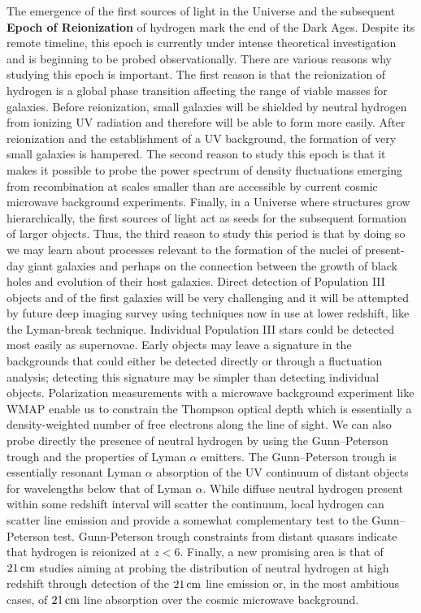 \documentclass[a4paper,11pt]{article}
\begin{document}
The emergence of the first sources of light in the Universe and the subsequent \textbf{Epoch of Reionization} of hydrogen mark the end of the Dark Ages. Despite its remote timeline, this epoch is currently under intense theoretical investigation and is beginning to be probed observationally. There are various reasons why studying this epoch is important. The first reason is that the reionization of hydrogen is a global phase transition affecting the range of viable masses for galaxies. Before reionization, small galaxies will be shielded by neutral hydrogen from ionizing UV radiation and therefore will be able to form more easily. After reionization and the establishment of a UV background, the formation of very small galaxies is hampered. The second reason to study this epoch is that it makes it possible to probe the power spectrum of density fluctuations emerging from recombination at scales smaller than are accessible by current cosmic microwave background experiments. Finally, in a Universe where structures grow hierarchically, the first sources of light act as seeds for the subsequent formation of larger objects. Thus, the third reason to study this period is that by doing so we may learn about processes relevant to the formation of the nuclei of present-day giant galaxies and perhaps on the connection between the growth of black holes and evolution of their host galaxies. Direct detection of Population III objects and of the first galaxies will be very challenging and it will be attempted by future deep imaging survey using techniques now in use at lower redshift, like the Lyman-break technique. Individual Population III stars could be detected most easily as supernovae. Early objects may leave a signature in the backgrounds that could either be detected directly or through a fluctuation analysis; detecting this signature may be simpler than detecting individual objects. Polarization measurements with a microwave background experiment like WMAP enable us to constrain the Thompson optical depth which is essentially a density-weighted number of free electrons along the line of sight. We can also probe directly the presence of neutral hydrogen by using the Gunn–Peterson trough and the properties of Lyman $\alpha$ emitters. The Gunn–Peterson trough is essentially resonant Lyman $\alpha$ absorption of the UV continuum of distant objects for wavelengths below that of Lyman $\alpha$. While diffuse neutral hydrogen present within some redshift interval will scatter the continuum, local hydrogen can scatter line emission and provide a somewhat complementary test to the Gunn–Peterson test. Gunn-Peterson trough constraints from distant quasars indicate that hydrogen is reionized at $z<6$. Finally, a new promising area is that of $21\,{\rm cm}$ studies aiming at probing the distribution of neutral hydrogen at high redshift through detection of the $21\,{\rm cm}$ line emission or, in the most ambitious cases, of $21\,{\rm cm}$ line absorption over the cosmic microwave background.
\end{document}
